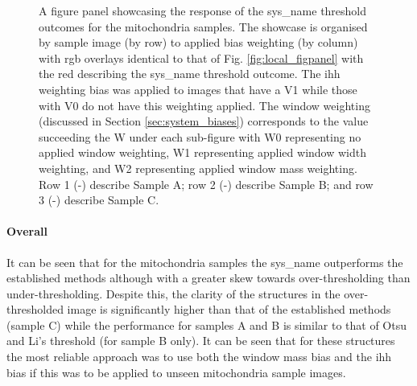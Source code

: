 \begin{figure}[h!]
    \caption[Figure panel showcasing the response of the different weighting biases on the system threshold outcomes for mitochondria samples]{A figure panel showcasing the response of the \gls{sys_name} threshold outcomes for the mitochondria samples. The showcase is organised by sample image (by row) to applied bias weighting (by column) with \gls{rgb} overlays identical to that of Fig. \ref{fig:local_figpanel} with the red describing the \gls{sys_name} threshold outcome. The \gls{ihh} weighting bias was applied to images that have a V1 while those with V0 do not have this weighting applied. The window weighting (discussed in Section \ref{sec:system_biases}) corresponds to the value succeeding the W under each sub-figure with W0 representing no applied window weighting, W1 representing applied window width weighting, and W2 representing applied window mass weighting. Row 1 (-) describe Sample A; row 2 (-) describe Sample B; and row 3 (-) describe Sample C.} 
    \label{fig:local_ihh_figpanel3}
\end{figure}

\paragraph{Overall}
It can be seen that for the mitochondria samples the \gls{sys_name} outperforms the established methods although with a greater skew towards over-thresholding than under-thresholding. Despite this, the clarity of the structures in the over-thresholded image is significantly higher than that of the established methods (sample C) while the performance for samples A and B is similar to that of Otsu and Li's threshold (for sample B only). It can be seen that for these structures the most reliable approach was to use both the window mass bias and the \gls{ihh} bias if this was to be applied to unseen mitochondria sample images.

